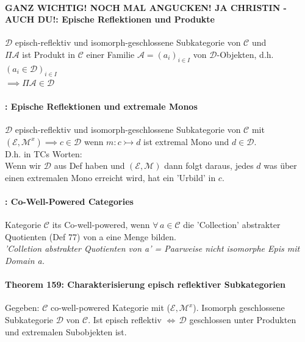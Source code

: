 \paragraph{GANZ WICHTIG! NOCH MAL ANGUCKEN! JA CHRISTIN - AUCH DU!: Epische Reflektionen und Produkte}

 $\mathcal{D}$ episch-reflektiv und isomorph-geschlossene Subkategorie von $\mathcal{C}$ und \\ $\Pi \mathcal{A}$ ist Produkt in $\mathcal{C}$ einer Familie $\mathcal{A} = (a_i)_{i \in I} $ von $\mathcal{D}$-Objekten, d.h. $(a_i \in \mathcal{D})_{i \in I}$ \\$ \implies \Pi \mathcal{A} \in \mathcal{D}$
 
 \paragraph{: Epische Reflektionen und extremale Monos}
 $\mathcal{D}$ episch-reflektiv und isomorph-geschlossene Subkategorie von $\mathcal{C}$ mit $(\mathcal{E}, \mathcal{M}^x) \implies c \in \mathcal{D}$ wenn $m: c \rightarrowtail d$ ist extremal Mono und $d \in \mathcal{D}$. \\
 D.h. in TCs Worten: \\
 Wenn wir $\mathcal{D}$ aus Def haben und  $(\mathcal{E}, \mathcal{M})$ dann folgt daraus, jedes $d$ was über einen extremalen Mono erreicht wird, hat ein 'Urbild' in $c$.
 
 
\paragraph{: Co-Well-Powered Categories}
Kategorie $\mathcal{C}$ its Co-well-powered, wenn $\forall \, a \in \mathcal{C}$ die 'Collection' abstrakter Quotienten (Def 77) von a eine Menge bilden. \\
\emph{'Colletion abstrakter Quotienten von a' = Paarweise nicht isomorphe Epis mit Domain a.}
 
 
\paragraph{Theorem 159: Charakterisierung episch reflektiver Subkategorien} 
Gegeben: $\mathcal{C}$ co-well-powered Kategorie mit ($\mathcal{E},\mathcal{M}^x$). Isomorph geschlossene Subkategorie $\mathcal{D}$ von $\mathcal{C}$. Ist episch reflektiv $\Leftrightarrow \, \mathcal{D} $ geschlossen unter Produkten und extremalen Subobjekten ist. 
 
